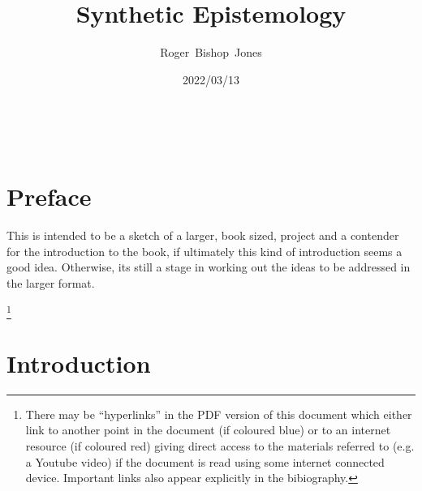 \documentclass[10pt,titlepage]{article}
\title{\LARGE\bf Synthetic Epistemology}
\author{Roger~Bishop~Jones}
\date{\small 2022/03/13}
\newcommand{\ignore}[1]{}
\begin{document}
                               
\begin{titlepage}
\maketitle





\end{titlepage}

\ \

\ignore{
\begin{centering}
{}
\end{centering}
}%

\setcounter{tocdepth}{2}
{\parskip-0pt\tableofcontents}


\pagebreak

\section*{Preface}

This is intended to be a sketch of a larger, book sized, project and a contender for the introduction to the book, if ultimately this kind of introduction seems a good idea.
Otherwise, its still a stage in working out the ideas to be addressed in the larger format.

\footnote{There may be ``hyperlinks'' in the PDF version of this document which either link to another point in the document  (if coloured blue) or to an internet resource  (if coloured red) giving direct access to the materials referred to (e.g. a Youtube video) if the document is read using some internet connected device.
Important links also appear explicitly in the bibiography.}

\pagebreak
\section{Introduction}
\end{document}
